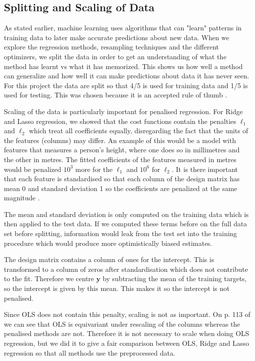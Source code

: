 \documentclass[reprint,english,notitlepage]{revtex4-2}  %
\begin{document}
\subsection{Splitting and Scaling of Data}
As stated earlier, machine learning uses algorithms that can "learn" patterns in training data to later make accurate predictions about new data. When we explore the regression methods, resampling techniques and the different optimizers, we split the data in order to get an understanding of what the method has learnt vs what it has memorized. This shows us how well a method can generalize and how well it can make predictions about data it has never seen. For this project the data are split so that 4/5 is used for training data and 1/5 is used for testing. This was chosen because it is an accepted rule of thumb \cite{project1_task}. 

Scaling of the data is particularly important for penalised regression. For Ridge and Lasso regression, we showed that the cost functions contain the penalties $\ell_1$ and $\ell_2$ which treat all coefficients equally, disregarding the fact that the units of the features (columns) may differ. An example of this would be a model with features that measures a person's height, where one does so in millimetres and the other in metres. The fitted coefficients of the features measured in metres would be penalized $10^3$ more for the $\ell_1$ and $10^6$ for $\ell_2$. It is there important that each feature is standardised so that each column of the design matrix has mean 0 and standard deviation 1 so the coefficients are penalized at the same magnitude \cite{lecture_book}.

The mean and standard deviation is only computed on the training data which is then applied to the test data. If we computed these terms before on the full data set before splitting, information would leak from the test set into the training procedure which would produce more optimistically biased estimates.

The design matrix contains a column of ones for the intercept. This is transformed to a column of zeros after standardisation which does not contribute to the fit. Therefore we centre $\bm{y}$ by subtracting the mean of the training targets, so the intercept is given by this mean. This makes it so the intercept is not penalised.

Since OLS does not contain this penalty, scaling is not as important. On p. 113 of \cite{lecture_book} we can see that OLS is equivariant under rescaling of the columns whereas the penalised methods are not. Therefore it is not necessary to scale when doing OLS regression, but we did it to give a fair comparison between OLS, Ridge and Lasso regression so that all methods use the preprocessed data. 
\end{document}

